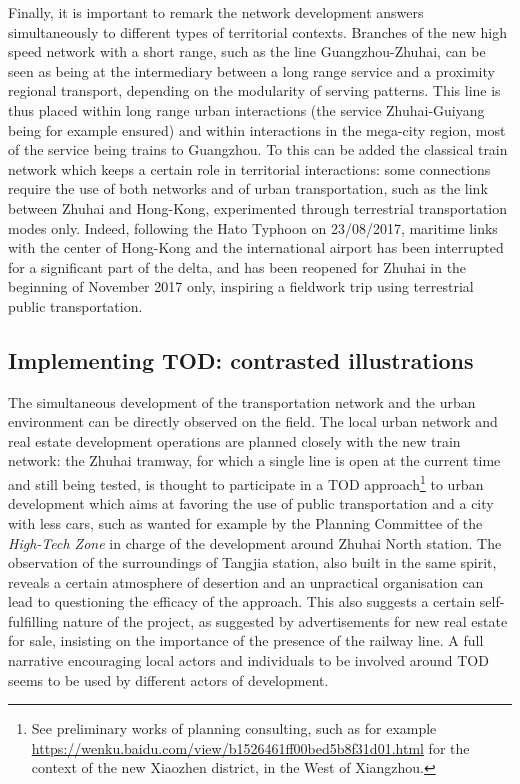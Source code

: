 Finally, it is important to remark the network development answers simultaneously to different types of territorial contexts. Branches of the new high speed network with a short range, such as the line Guangzhou-Zhuhai, can be seen as being at the intermediary between a long range service and a proximity regional transport, depending on the modularity of serving patterns. This line is thus placed within long range urban interactions (the service Zhuhai-Guiyang being for example ensured) and within interactions in the mega-city region, most of the service being trains to Guangzhou. To this can be added the classical train network which keeps a certain role in territorial interactions: some connections require the use of both networks and of urban transportation, such as the link between Zhuhai and Hong-Kong, experimented through terrestrial transportation modes only. Indeed, following the Hato Typhoon on 23/08/2017, maritime links with the center of Hong-Kong and the international airport has been interrupted for a significant part of the delta, and has been reopened for Zhuhai in the beginning of November 2017 only, inspiring a fieldwork trip using terrestrial public transportation.


\subsection{Implementing TOD: contrasted illustrations}

The simultaneous development of the transportation network and the urban environment can be directly observed on the field. The local urban network and real estate development operations are planned closely with the new train network: the Zhuhai tramway, for which a single line is open at the current time and still being tested, is thought to participate in a TOD approach\footnote{See preliminary works of planning consulting, such as for example \url{https://wenku.baidu.com/view/b1526461ff00bed5b8f31d01.html} for the context of the new Xiaozhen district, in the West of Xiangzhou.} to urban development which aims at favoring the use of public transportation and a city with less cars, such as wanted for example by the Planning Committee of the \emph{High-Tech Zone} in charge of the development around Zhuhai North station. The observation of the surroundings of Tangjia station, also built in the same spirit, reveals a certain atmosphere of desertion and an unpractical organisation can lead to questioning the efficacy of the approach. This also suggests a certain self-fulfilling nature of the project, as suggested by advertisements for new real estate for sale, insisting on the importance of the presence of the railway line. A full narrative encouraging local actors and individuals to be involved around TOD seems to be used by different actors of development.

